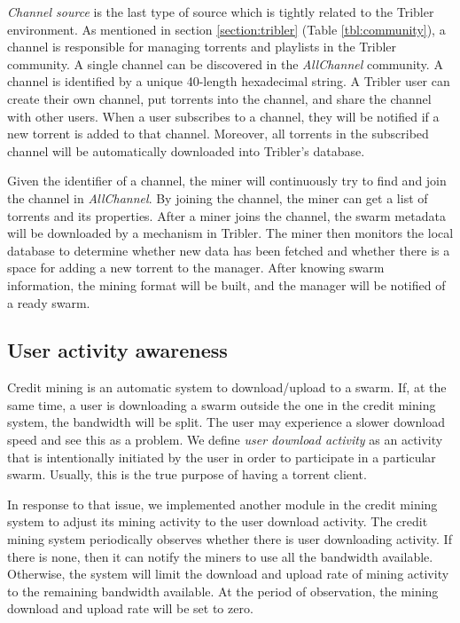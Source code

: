 \textit{Channel source} is the last type of source which is tightly related to the Tribler environment. As mentioned in section \ref{section:tribler} (Table \ref{tbl:community}), a channel is responsible for managing torrents and playlists in the Tribler community. A single channel can be discovered in the \textit{AllChannel} community. A channel is identified by a unique 40-length hexadecimal string. A Tribler user can create their own channel, put torrents into the channel, and share the channel with other users. When a user subscribes to a channel, they will be notified if a new torrent is added to that channel. Moreover, all torrents in the subscribed channel will be automatically downloaded into Tribler's database.

Given the identifier of a channel, the miner will continuously try to find and join the channel in \textit{AllChannel}. By joining the channel, the miner can get a list of torrents and its properties. After a miner joins the channel, the swarm metadata will be downloaded by a mechanism in Tribler. The miner then monitors the local database to determine whether new data has been fetched and whether there is a space for adding a new torrent to the manager. After knowing swarm information, the mining format will be built, and the manager will be notified of a ready swarm.

\subsection{User activity awareness}
\label{section:uactivityimpl}
Credit mining is an automatic system to download/upload to a swarm. If, at the same time, a user is downloading a swarm outside the one in the credit mining system, the bandwidth will be split. The user may experience a slower download speed and see this as a problem. We define \textit{user download activity} as an activity that is intentionally initiated by the user in order to participate in a particular swarm. Usually, this is the true purpose of having a torrent client. 

In response to that issue, we implemented another module in the credit mining system to adjust its mining activity to the user download activity. The credit mining system periodically observes whether there is user downloading activity. If there is none, then it can notify the miners to use all the bandwidth available. Otherwise, the system will limit the download and upload rate of mining activity to the remaining bandwidth available. At the period of observation, the mining download and upload rate will be set to zero.


